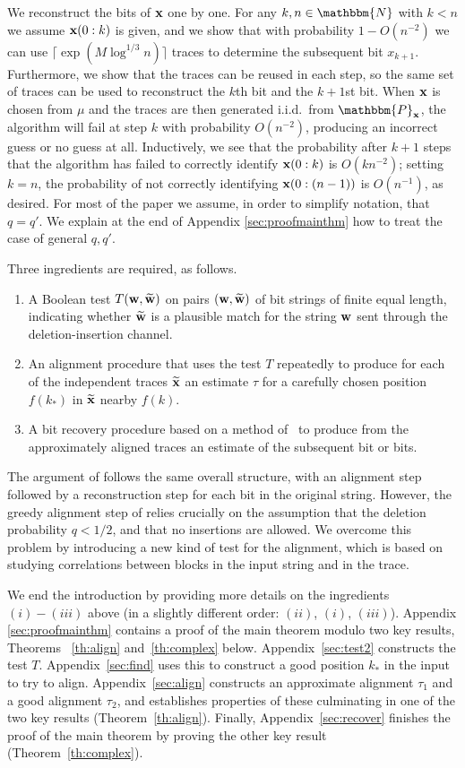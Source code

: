 \documentclass[final,12pt]{colt2018} %
\newcommand{\N}{\mathbbm{N}}
\renewcommand{\P}{\mathbbm{P}}
\newcommand{\1}{\mathbf{1}}
\newcommand{\wt}{\widetilde}
\def\xt{{\wt {\bf x}}}
\def\x{{\bf x}}
\def\w{{\bf w}}
\begin{document}
We reconstruct the bits of $\x$ one by one.  For any $k,n \in \N$ with
$k <n$ we assume $\x(0:k)$ is given, and we show that with
probability $1-O(n^{-2})$ we can use $\lceil\exp(M\log^{1/3}n)\rceil$
traces to determine the subsequent bit $x_{k+1}$. Furthermore, we show that the traces can be reused in each step, so the same set of traces can be used to reconstruct the $k$th bit and the $k+1$st bit. When $\x$ is
chosen from $\mu$ and the traces are then generated i.i.d.\ from $\P_\x$, the algorithm will fail at step $k$ with probability
$O(n^{-2})$, producing an incorrect guess or no guess at all.
Inductively, we see that the probability after $k+1$ steps that the
algorithm has failed to correctly identify $\x(0:k)$ is $O(k n^{-2})$;
setting $k=n$, the probability of not correctly identifying $\x(0:(n-1))$
is $O(n^{-1})$, as desired.  For most of the paper we assume, in order to simplify notation, that $q = q'$.
We explain at the end of Appendix \ref{sec:proofmainthm} how to treat the case of general $q,q'$. 

Three ingredients are required, as follows.
\begin{enumerate}[$(i)$]
	\item  A Boolean test $T(\w, \wt\w)$ on pairs $(\w, \wt\w)$ of bit strings	of finite equal length, indicating whether $\wt\w$ is a plausible match for the string $\w$ sent through the deletion-insertion channel.
	\item An alignment procedure that uses the test $T$ repeatedly to
	produce for each of the independent traces $\xt$ an estimate $\tau$
	for a carefully chosen position $f(k_*)$ in $\xt$ nearby $f(k)$.
	\item A bit recovery procedure based on a method of~\citet*{PZ17,DOS16,NP16} to produce
	from the approximately aligned traces an estimate of the subsequent bit
	or bits.
\end{enumerate}

The argument of \citet*{PZ17} follows the same overall structure, with an alignment step followed by a reconstruction step for each bit in the original string. However, the greedy alignment step of \citet*{PZ17} relies crucially on the  assumption that the deletion probability $q<1/2$, and that no insertions are allowed. We overcome this problem by introducing a new kind of test for the alignment, which is based on studying correlations between blocks in the input string and in the trace.

We end the introduction by providing more details on the ingredients
$(i)-(iii)$ above (in a slightly different order: $(ii)$, $(i)$, $(iii)$).
Appendix \ref{sec:proofmainthm} contains a proof of the main theorem
modulo two key results, Theorems ~\ref{th:align} and~\ref{th:complex} below. Appendix~\ref{sec:test2} constructs
the test $T$. Appendix~\ref{sec:find} uses this to construct
a good position $k_*$ in the input to try to align.
Appendix~\ref{sec:align} constructs an approximate alignment
$\tau_1$ and a good alignment $\tau_2$, and establishes
properties of these culminating in one of the two key results (Theorem~\ref{th:align}).  Finally, Appendix~\ref{sec:recover}
finishes the proof of the main theorem by proving the other key
result (Theorem~\ref{th:complex}).
\end{document}
